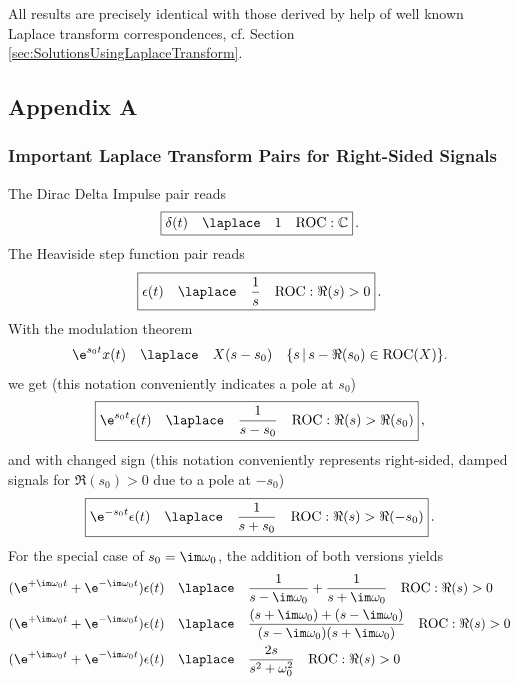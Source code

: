All results are precisely identical with those derived by help of well known Laplace transform correspondences,
cf. Section \ref{sec:SolutionsUsingLaplaceTransform}.
\clearpage
\subsection*{Appendix A}

\subsubsection*{Important Laplace Transform Pairs for Right-Sided Signals}
The Dirac Delta Impulse pair reads
\begin{align}
\boxed{\delta(t) \quad \laplace \quad 1 \quad \text{ROC}: \mathbb{C}}\,.
\end{align}
The Heaviside step function pair reads
\begin{align}
\boxed{\epsilon(t) \quad \laplace \quad \frac{1}{s} \quad \text{ROC}: \Re(s)>0}\,.
\end{align}
With the modulation theorem
\begin{align}
\e^{s_0 t} x(t) \quad \laplace \quad X(s-s_0) \quad \{s \, | \, s-\Re(s_0) \in \text{ROC}(X)\}.
\end{align}
we get (this notation conveniently indicates a pole at $s_0$)
\begin{align}
\boxed{\e^{s_0 t} \epsilon(t)\quad \laplace \quad \frac{1}{s-s_0} \quad \text{ROC}: \Re(s)>\Re(s_0)}\,,
\end{align}
and with changed sign (this notation conveniently represents right-sided,
damped signals for $\Re(s_0)>0$ due to a pole at $-s_0$)
\begin{align}
\boxed{\e^{-s_0 t} \epsilon(t)\quad \laplace \quad \frac{1}{s+s_0} \quad \text{ROC}: \Re(s)>\Re(-s_0)}\,.
\end{align}
%
For the special case of $s_0 = \im \omega_0$, the addition of both versions
yields
\begin{align}
(\e^{+\im \omega_0 t} + \e^{-\im \omega_0 t})  \epsilon(t)\quad &\laplace \quad \frac{1}{s-\im \omega_0} + \frac{1}{s+\im \omega_0} \quad \text{ROC}: \Re(s)>0\\
(\e^{+\im \omega_0 t} + \e^{-\im \omega_0 t})  \epsilon(t)\quad &\laplace \quad \frac{(s+\im \omega_0) + (s-\im \omega_0)}{(s-\im \omega_0)(s+\im \omega_0)}\quad \text{ROC}: \Re(s)>0\\
(\e^{+\im \omega_0 t} + \e^{-\im \omega_0 t})  \epsilon(t)\quad &\laplace \quad \frac{2 s}{s^2 + \omega_0^2}\quad \text{ROC}: \Re(s)>0
\end{align}

